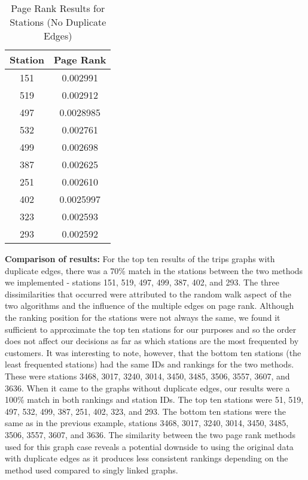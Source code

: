 \documentclass{article}
\begin{document}
 \begin{table}[h!]
\caption{Page Rank Results for Stations (No Duplicate Edges)}
\centering
 \begin{tabular}{||c c||} 
 \hline
 Station & Page Rank \\ [0.5ex] 
 \hline\hline
 151 & 0.002991\\ 
 519 & 0.002912\\
 497 & 0.0028985\\ 
 532 & 0.002761\\
 499 & 0.002698\\
 387 & 0.002625\\
 251 & 0.002610\\
 402 & 0.0025997\\
 323 & 0.002593\\
 293 & 0.002592\\[1ex] 
 \hline
 \end{tabular}
 \end{table}
 \textbf{Comparison of results:}
 \newline
	For the top ten results of the trips graphs with duplicate edges, there was a 70\% match in the stations between the two methods we implemented - stations 151, 519, 497, 499, 387, 402, and 293. The three dissimilarities that occurred were attributed to the random walk aspect of the two algorithms and the influence of the multiple edges on page rank. Although the ranking position for the stations were not always the same, we found it sufficient to approximate the top ten stations for our purposes and so the order does not affect our decisions as far as which stations are the most frequented by customers. It was interesting to note, however, that the bottom ten stations (the least frequented stations) had the same IDs and rankings for the two methods. These were stations  3468, 3017, 3240, 3014, 3450, 3485, 3506, 3557, 3607, and 3636.
 \newline
When it came to the graphs without duplicate edges, our results were a 100\% match in both rankings and station IDs. The top ten stations were 51, 519, 497, 532, 499, 387, 251, 402, 323, and 293. The bottom ten stations were the same as in the previous example, stations 3468, 3017, 3240, 3014, 3450, 3485, 3506, 3557, 3607, and 3636. The similarity between the two page rank methods used for this graph case reveals a potential downside to using the original data with duplicate edges as it produces less consistent rankings depending on the method used compared to singly linked graphs. 
\newline
\end{document}
